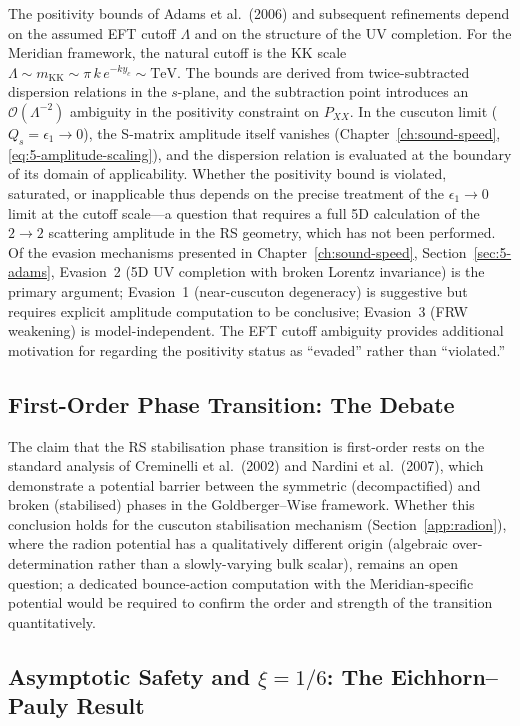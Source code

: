 The positivity bounds of Adams et al.~(2006) and subsequent refinements depend on the assumed EFT cutoff $\Lambda$ and on the structure of the UV completion. For the Meridian framework, the natural cutoff is the KK scale $\Lambda \sim m_\mathrm{KK} \sim \pi\,k\,e^{-ky_c} \sim \mathrm{TeV}$. The bounds are derived from twice-subtracted dispersion relations in the $s$-plane, and the subtraction point introduces an $\mathcal{O}(\Lambda^{-2})$ ambiguity in the positivity constraint on $P_{XX}$. In the cuscuton limit ($Q_s = \epsilon_1 \to 0$), the S-matrix amplitude itself vanishes (Chapter~\ref{ch:sound-speed}, \eqref{eq:5-amplitude-scaling}), and the dispersion relation is evaluated at the boundary of its domain of applicability. Whether the positivity bound is violated, saturated, or inapplicable thus depends on the precise treatment of the $\epsilon_1 \to 0$ limit at the cutoff scale---a question that requires a full 5D calculation of the $2 \to 2$ scattering amplitude in the RS geometry, which has not been performed. Of the evasion mechanisms presented in Chapter~\ref{ch:sound-speed}, Section~\ref{sec:5-adams}, Evasion~2 (5D UV completion with broken Lorentz invariance) is the primary argument; Evasion~1 (near-cuscuton degeneracy) is suggestive but requires explicit amplitude computation to be conclusive; Evasion~3 (FRW weakening) is model-independent. The EFT cutoff ambiguity provides additional motivation for regarding the positivity status as ``evaded'' rather than ``violated.''

\subsection{First-Order Phase Transition: The Debate}
\label{app:first-order-debate}

The claim that the RS stabilisation phase transition is first-order rests on the standard analysis of Creminelli et al.~(2002) and Nardini et al.~(2007), which demonstrate a potential barrier between the symmetric (decompactified) and broken (stabilised) phases in the Goldberger--Wise framework. Whether this conclusion holds for the cuscuton stabilisation mechanism (Section~\ref{app:radion}), where the radion potential has a qualitatively different origin (algebraic over-determination rather than a slowly-varying bulk scalar), remains an open question; a dedicated bounce-action computation with the Meridian-specific potential would be required to confirm the order and strength of the transition quantitatively.

\subsection{Asymptotic Safety and $\xi = 1/6$: The Eichhorn--Pauly Result}
\label{app:eichhorn-xi}

